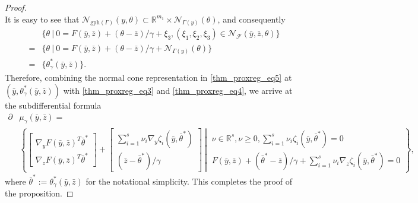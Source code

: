 \documentclass[11pt,a4paper]{article}
\theoremstyle{plain}
\begin{document}
\begin{proof}
$$$$
It is easy to see that $\mathcal{N}_{\mathrm{gph}(\Gamma)}(y , \theta) \subset \mathbb{R}^{m_1} \times \mathcal{N}_{\Gamma(y)}(\theta)$, and consequently
\begin{equation*}
    \begin{aligned}
        &\{ \theta ~|~ 0 = F(\bar{y}, \bar{z}) + (\theta - \bar{z})/\gamma + \xi_3,  (\xi_1, \xi_2, \xi_3)\in \mathcal{N}_{\mathcal{F}}(\bar y, \bar{z}, \theta)\} \\
        =& \{ \theta ~|~ 0 = F(\bar{y}, \bar{z}) + (\theta - \bar{z})/\gamma + \mathcal{N}_{\Gamma(y)}(\theta)\} \\
        =& \{	\theta_\gamma^*(\bar y, \bar{z})\}.
    \end{aligned}
\end{equation*}
Therefore, combining the normal cone representation in \eqref{thm_proxreg_eq5}  at $(\bar{y}, \theta_\gamma^*(\bar y, \bar{z}))$ with \eqref{thm_proxreg_eq3} and \eqref{thm_proxreg_eq4}, we arrive at  the subdifferential formula 
\begin{equation*}
    \begin{aligned}
        \partial&\mu_\gamma(\bar y,\bar z)=\\
&\left\{ \left. \begin{bmatrix}
\nabla_y F(\bar{y}, \bar{z})^T \bar\theta^* \\
\nabla_z F(\bar{y}, \bar{z})^T \bar\theta^* 
\end{bmatrix}+  \begin{bmatrix}
\sum_{i = 1}^{s} \nu_i \nabla_y \zeta_i(\bar{y}, \bar\theta^*)  \\ (\bar{z} - \bar\theta^*)/\gamma 	
\end{bmatrix} 	~\right|~ 
\begin{array}{c}
\nu \in \mathbb{R}^s, \nu \ge 0, \sum_{i = 1}^{s}\nu_i \zeta_i(\bar{y}, \bar\theta^* ) = 0 \\
F(\bar y,\bar z)+(\bar\theta^*-\bar z)/{\gamma}+\sum_{i=1}^s\nu_i\nabla_z\zeta_i(\bar y,\bar\theta^*)=0
\end{array}   
\right\},
    \end{aligned}
\end{equation*}
where $\bar\theta^*:=\theta_\gamma^*(\bar y,\bar z)$ for the notational simplicity. This completes the proof of the proposition.
\end{proof}\vspace*{0.07in}
\end{document}
